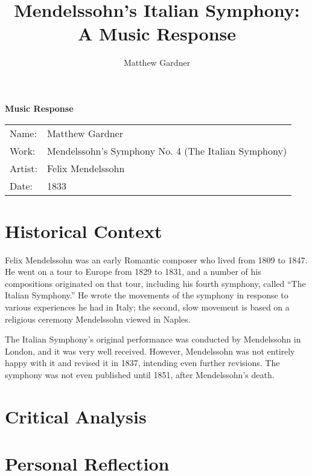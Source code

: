 \documentclass[onecolumn, 12pt]{article}
\title{Mendelssohn's Italian Symphony: A Music Response}
\author{Matthew Gardner}
\date{}
\begin{document}
\textbf{Music Response}

\begin{tabular}{ll}
  Name:&Matthew Gardner \\
  Work:&Mendelssohn's Symphony No. 4 (The Italian Symphony) \\
  Artist:&Felix Mendelssohn \\
  Date:&1833 \\
\end{tabular}


\section*{Historical Context}

Felix Mendelssohn was an early Romantic composer who lived from 1809 to 1847.
He went on a tour to Europe from 1829 to 1831, and a number of his compositions
originated on that tour, including his fourth symphony, called ``The Italian
Symphony.''  He wrote the movements of the symphony in response to various
experiences he had in Italy; the second, slow movement is based on a religious
ceremony Mendelssohn viewed in Naples.

The Italian Symphony's original performance was conducted by Mendelssohn in
London, and it was very well received.  However, Mendelssohn was not entirely
happy with it and revised it in 1837, intending even further revisions.  The
symphony was not even published until 1851, after Mendelssohn's death.

\section*{Critical Analysis}

\section*{Personal Reflection}
\end{document}
